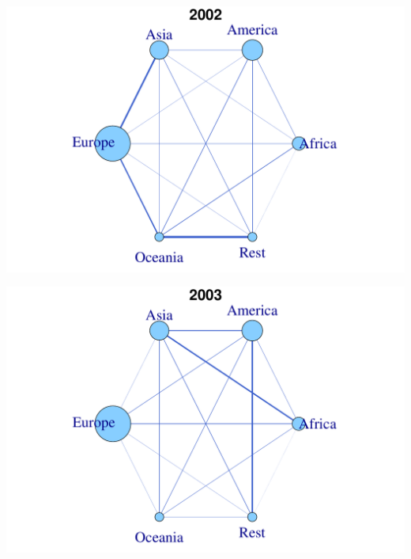 \documentclass[a4paper,ngerman,oneside,titlepage,bibliography=totoc,11pt]{scrreprt}
\begin{document}
\begin{minipage}[t]{0.48\textwidth}
		\centering
			\includegraphics[width=1\textwidth]{Grafiken/Cont_Ani/cont11.pdf}
\end{minipage}	
\hfill	
\begin{minipage}[t]{0.48\textwidth}	
			\centering
			\includegraphics[width=1\textwidth]{Grafiken/Cont_Ani/cont12.pdf}
\end{minipage}
\end{document}
